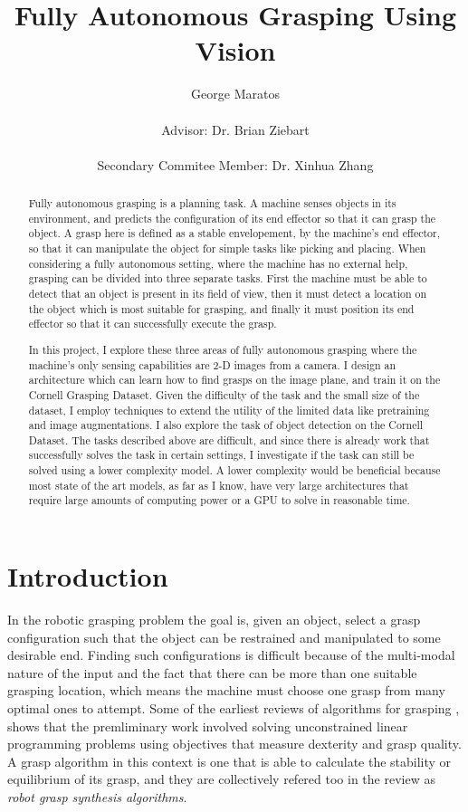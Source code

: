 \documentclass{article}
\title{Fully Autonomous Grasping Using Vision}
\author{George Maratos\\\\Advisor: Dr. Brian Ziebart\\\\Secondary Commitee Member: Dr. Xinhua Zhang}
\begin{document}
\maketitle

\newpage
\begin{abstract}
Fully autonomous grasping is a planning task. A machine senses objects in its
environment, and predicts the configuration of its end effector so that it can
grasp the object. A grasp here is defined as a stable envelopement, by the machine's
end effector, so that it can manipulate the object for simple tasks like picking
and placing. When considering a fully autonomous setting, where the machine has no
external help, grasping can be divided into three separate tasks. First the machine
must be able to detect that an object is present in its field of view, then it must
detect a location on the object which is most suitable for grasping, and finally
it must position its end effector so that it can successfully execute the grasp.

In this project, I explore these three areas of fully autonomous grasping where the
machine's only sensing capabilities are 2-D images from a camera. I design an
architecture which can learn how to find grasps on the image plane, and train it
on the Cornell Grasping Dataset. Given the difficulty of the task and the
small size of the dataset, I employ techniques to extend the utility of the
limited data like pretraining and image augmentations. I also explore the task
of object detection on the Cornell Dataset. The tasks described above are
difficult, and since there is already work that successfully solves the task
in certain settings, I investigate if the task can still be solved
using a lower complexity model. A lower complexity would be beneficial because
most state of the art models, as far as I know, have very large architectures
that require large amounts of computing power or a GPU to solve in reasonable time.

\end{abstract}

\newpage
\tableofcontents
\newpage
\section{Introduction}
In the robotic grasping problem the goal is, given an object, select a grasp
configuration such that the object can be restrained and
manipulated to some desirable end. Finding such configurations is difficult
because of the multi-modal nature of the input and the fact that there can be
more than one suitable grasping location, which means the machine must choose
one grasp from many optimal ones to attempt.
Some of the earliest reviews of algorithms for grasping \cite{shimoga96,bicchi00},
shows that the premliminary work involved solving unconstrained linear programming
problems using objectives that measure dexterity and grasp quality. A grasp
algorithm in this context is one that is able to calculate the stability or
equilibrium of its grasp, and they are collectively refered too in the
review as \textit{robot grasp synthesis algorithms}.
\end{document}

